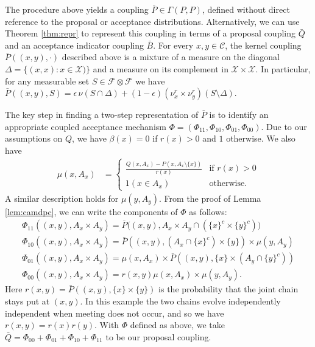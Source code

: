 \documentclass[aihp]{imsart}
\theoremstyle{plain}
\theoremstyle{remark}
\theoremstyle{definition} \newtheorem{example}{Example}
\newcommand{\eq}[1]{\begin{align*}#1\end{align*}} %
\newcommand{\ec}[1]{\begin{gather*}#1\end{gather*}} %
\newcommand{\scrF}{\mathscr{F}}
\newcommand{\calC}{\mathcal{C}}
\newcommand{\calX}{\mathcal{X}}
\newcommand{\eps}{\epsilon}
\newcommand{\bp}{\bar P}
\newcommand{\bq}{\bar Q}
\newcommand{\bb}{\bar B}
\newcommand{\sm}{\setminus}
\newcommand{\sx}{\{ x \}}
\newcommand{\sy}{\{ y \}}
\newcommand{\xy}{(x,y)}
\begin{document}
The procedure above yields a coupling $\bp \in \Gamma(P,P)$, defined without direct
reference to the proposal or acceptance distributions. Alternatively, we can use Theorem
\ref{thm:repr} to represent this coupling in terms of a proposal coupling $\bq$ and an acceptance
indicator coupling $\bb$. For every $x,y \in \calC$, the kernel coupling $\bp(\xy, \cdot)$ described
above is a mixture of a measure on the diagonal $\Delta = \{(x,x) : x \in \calX) \}$ and a measure
on its complement in $\calX \times \calX$. In particular, for any measurable set $S \in
\scrF \otimes \scrF$ we have $\bp(\xy, S) =\eps\, \nu(S \cap \Delta) + (1 - \eps) (\nu^r_x \times
\nu^r_y) (S \sm \Delta)$.

The key step in finding a two-step representation of $\bp$ is to identify an appropriate coupled
acceptance mechanism $\Phi = (\Phi_{11}, \Phi_{10}, \Phi_{01}, \Phi_{00})$.
Due to our assumptions on $Q$, we have
$\beta(x) = 0$ if $r(x)> 0$ and $1$ otherwise. We also have
\eq{
\mu(x,A_x) & = \begin{cases}
	\frac{Q(x,A_x) - P(x,A_x\setminus\{x\})}{r(x)} & \text{if } r(x) > 0 \\
	1(x \in A_x) & \text{otherwise}.
\end{cases}
}
A similar description holds for $\mu(y, A_y)$. From the proof of Lemma \ref{lem:camdpc}, we can
write the components of $\Phi$ as follows:
\ec{
\Phi_{11}(\xy, A_x\times A_y)= \bp \big( \xy, A_x\times A_y \cap (\sx^c \times \sy^c) \big)\\
\Phi_{10}(\xy, A_x\times A_y) = \bp( \xy, (A_x \cap \sx^c) \times \sy) \times \mu(y, A_y)\\
\Phi_{01}(\xy, A_x\times A_y) = \mu(x,A_x)\times\bp( \xy,   \sx \times (A_y \cap \sy^c)) \\
\Phi_{00}(\xy, A_x\times A_y) =  r(x,y) \mu(x,A_x)\times\mu(y,A_y).
}
Here $r(x,y) =\bar P((x,y),\{x\}\times\{y\})$ is the probability that the joint chain stays put at
$(x,y)$. In this example the two chains evolve independently independent when meeting does not
occur, and so we have $r(x,y) = r(x) r(y)$. With $\Phi$ defined as above, we take
${\bar Q =\Phi_{00} +\Phi_{01} + \Phi_{10}+\Phi_{11}}$ to be our proposal coupling.
\end{document}
